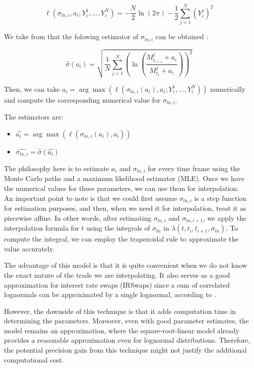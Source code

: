 \documentclass{article}
\begin{document}
\[
\ell(\sigma_{ln, i}, a_i; Y_i^1, \dots, Y_i^N) = -\frac{N}{2} \ln(2\pi) - \frac{1}{2} \sum_{j=1}^{N} (Y_i^j)^2
\]

We take from \cite{boinghoff2020alternatives} that the folowing estimator of $\sigma_{ln, i}$ can be obtained :

\[
\hat {\sigma}(a_i) = \sqrt{\frac{1}{N} \sum_{j=1}^{N} \left(\ln\left(\frac{M_{t_{i+1}}^j + a_i}{M_{t_i}^j + a_i}\right)\right)^2}
\]

Then, we can take \(a_i = \arg \max \left( \ell(\sigma_{ln, i}(a_i), a_i; Y_i^1, \dots, Y_i^N) \right)\) numerically and compute the corresponding numerical value for \(\sigma_{ln, i}\).

The estimators are:

\begin{itemize}

    \item \(\hat{a_i} = \arg \max \left( \ell(\sigma_{ln, i}(a_i), a_i) \right)\)
    \item \(\hat{\sigma_{ln, i}} = \hat {\sigma}(\hat{a_i})\)
\end{itemize}

The philosophy here is to estimate \(a_i\) and \(\sigma_{ln,i}\) for every time frame using the Monte Carlo paths and a maximum likelihood estimator (MLE). Once we have the numerical values for these parameters, we can use them for interpolation.\\


An important point to note is that we could first assume \(\sigma_{ln, i}\) is a step function for estimation purposes, and then, when we need it for interpolation, treat it as piecewise affine. In other words, after estimating \(\sigma_{ln, i}\) and \(\sigma_{ln, i+1}\), we apply the interpolation formula for \(t\) using the integrals of \(\sigma_{ln}\) in \(\lambda(t, t_i, t_{i+1}, \sigma_{ln})\). To compute the integral, we can employ the trapezoidal rule to approximate the value accurately.


The advantage of this model is that it is quite convenient when we do not know the exact nature of the trade we are interpolating. It also serves as a good approximation for interest rate swaps (IRSwaps) since a sum of correlated lognormals can be approximated by a single lognormal, according to \cite{szyszkowicz2009limit}.

However, the downside of this technique is that it adds computation time in determining the parameters. Moreover, even with good parameter estimates, the model remains an approximation, where the square-root-linear model already provides a reasonable approximation even for lognormal distributions. Therefore, the potential precision gain from this technique might not justify the additional computational cost.
\end{document}
